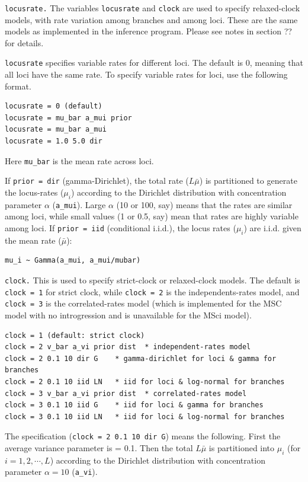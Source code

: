 \documentclass{book}
\numberwithin{equation}{section} \renewcommand{\baselinestretch}{0.55}
\begin{document}
\texttt{locusrate.}  The variables \texttt{locusrate} and
\texttt{clock} are used to specify relaxed-clock models, with rate
variation among branches and among loci.  These are the same models as
implemented in the inference program.  Please see notes in section ??
for details.

\texttt{locusrate} specifies variable rates for different loci.  The
default is 0, meaning that all loci have the same rate.  To specify
variable rates for loci, use the following format.
\begin{verbatim}
locusrate = 0 (default)
locusrate = mu_bar a_mui prior
locusrate = mu_bar a_mui
locusrate = 1.0 5.0 dir
\end{verbatim}
Here \texttt{mu\_bar} is the mean rate across loci.

If \texttt{prior = dir} (gamma-Dirichlet), the total rate ($L\bar\mu$)
is partitioned to generate the locus-rates ($\mu_i$) according to the
Dirichlet distribution with concentration parameter $\alpha$
(\texttt{a\_mui}).  Large $\alpha$ (10 or 100, say) means that the
rates are similar among loci, while small values (1 or 0.5, say) mean
that rates are highly variable among loci. If \texttt{prior = iid}
(conditional i.i.d.), the locus rates ($\mu_i$) are i.i.d. given the
mean rate ($\bar\mu$):
\begin{verbatim}
mu_i ~ Gamma(a_mui, a_mui/mubar)
\end{verbatim}

\texttt{clock.}  This is used to specify strict-clock or relaxed-clock
models.  The default is \texttt{clock = 1} for strict clock, while
\texttt{clock = 2} is the independents-rates model, and \texttt{clock
  = 3} is the correlated-rates model (which is implemented for the MSC
model with no introgression and is unavailable for the MSci model).
\begin{verbatim}
clock = 1 (default: strict clock)
clock = 2 v_bar a_vi prior dist  * independent-rates model
clock = 2 0.1 10 dir G    * gamma-dirichlet for loci & gamma for branches
clock = 2 0.1 10 iid LN   * iid for loci & log-normal for branches
clock = 3 v_bar a_vi prior dist  * correlated-rates model
clock = 3 0.1 10 iid G    * iid for loci & gamma for branches
clock = 3 0.1 10 iid LN   * iid for loci & log-normal for branches
\end{verbatim}
The specification (\texttt{clock = 2 0.1 10 dir G}) means the
following.  First the average variance parameter is = 0.1.  Then the
total $L\bar\mu$ is partitioned into $\mu_i$ (for
$i = 1, 2, \cdots, L$) according to the Dirichlet distribution with
concentration parameter $\alpha = 10$ (\texttt{a\_vi}).
\end{document}
